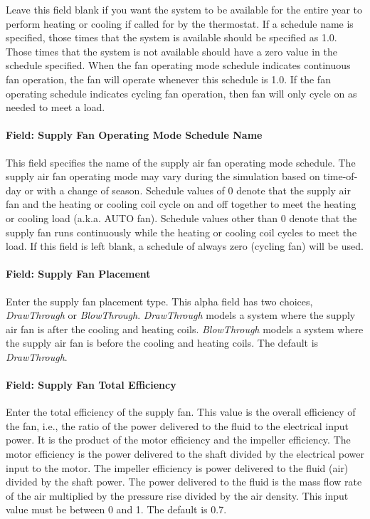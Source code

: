 Leave this field blank if you want the system to be available for the entire year to perform heating or cooling if called for by the thermostat. If a schedule name is specified, those times that the system is available should be specified as 1.0. Those times that the system is not available should have a zero value in the schedule specified. When the fan operating mode schedule indicates continuous fan operation, the fan will operate whenever this schedule is 1.0. If the fan operating schedule indicates cycling fan operation, then fan will only cycle on as needed to meet a load.

\paragraph{Field: Supply Fan Operating Mode Schedule Name}\label{field-supply-fan-operating-mode-schedule-name-2}

This field specifies the name of the supply air fan operating mode schedule. The supply air fan operating mode may vary during the simulation based on time-of-day or with a change of season. Schedule values of 0 denote that the supply air fan and the heating or cooling coil cycle on and off together to meet the heating or cooling load (a.k.a. AUTO fan). Schedule values other than 0 denote that the supply fan runs continuously while the heating or cooling coil cycles to meet the load. If this field is left blank, a schedule of always zero (cycling fan) will be used.

\paragraph{Field: Supply Fan Placement}\label{field-supply-fan-placement-2}

Enter the supply fan placement type. This alpha field has two choices, \emph{DrawThrough} or \emph{BlowThrough}. \emph{DrawThrough} models a system where the supply air fan is after the cooling and heating coils. \emph{BlowThrough} models a system where the supply air fan is before the cooling and heating coils. The default is \emph{DrawThrough}.

\paragraph{Field: Supply Fan Total Efficiency}\label{field-supply-fan-total-efficiency-3}

Enter the total efficiency of the supply fan. This value is the overall efficiency of the fan, i.e., the ratio of the power delivered to the fluid to the electrical input power. It is the product of the motor efficiency and the impeller efficiency. The motor efficiency is the power delivered to the shaft divided by the electrical power input to the motor. The impeller efficiency is power delivered to the fluid (air) divided by the shaft power. The power delivered to the fluid is the mass flow rate of the air multiplied by the pressure rise divided by the air density. This input value must be between 0 and 1. The default is 0.7.

